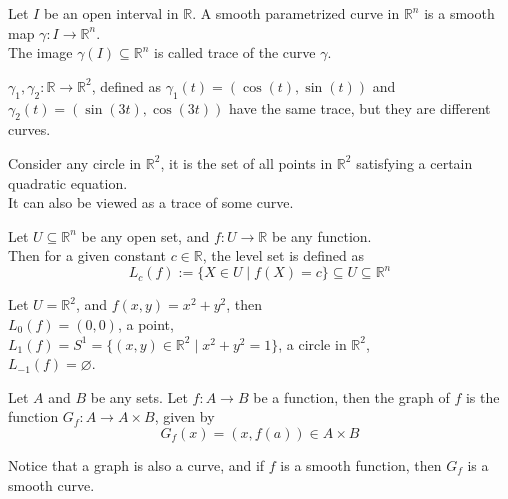 
\begin{definition}[Curves]
    Let $I$ be an open interval in $\mathbb{R}$. A smooth parametrized curve in $\mathbb{R}^n$ is a smooth map $\gamma:I\to\mathbb{R}^n$.\\
    The image $\gamma(I)\subseteq\mathbb{R}^n$ is called trace of the curve $\gamma$.
\end{definition}
\vspace{0.4cm}
\begin{eg}
    $\gamma_1,\gamma_2:\mathbb{R}\to\mathbb{R}^2$, defined as $\gamma_1(t)=(\cos(t),\sin(t))$ and $\gamma_2(t)=(\sin(3t),\cos(3t))$ have the same trace, but they are different curves.
\end{eg}
\vspace{0.4cm}
\begin{observe}
    Consider any circle in $\mathbb{R}^2$, it is the set of all points in $\mathbb{R}^2$ satisfying a certain quadratic equation.\\
    It can also be viewed as a trace of some curve.
\end{observe}
\vspace{0.4cm}
\begin{definition}
    Let $U\subseteq\mathbb{R}^n$ be any open set, and $f:U\to\mathbb{R}$ be any function.\\
    Then for a given constant $c\in\mathbb{R}$, the level set is defined as$$L_{c}(f):=\{X \in U \mid f(X)=c\} \subseteq U \subseteq\mathbb{R}^n$$
\end{definition}
\vspace{0.4cm}
\begin{eg}
    Let $U=\mathbb{R}^2$, and $f(x,y)=x^2+y^2$, then\\ 
    $L_{0}(f)={(0,0)}$, a point,\\
    $L_{1}(f)=S^{1}=\{(x,y)\in\mathbb{R}^2\mid x^2+y^2=1\}$, a circle in $\mathbb{R}^2$,\\
    $L_{-1}(f)=\varnothing$.
\end{eg}
\vspace{0.4cm}
\begin{definition}[Graph]
    Let $A$ and $B$ be any sets. Let $f:A\to B$ be a function, then the graph of $f$ is the function $G_{f}:A\to A\times B$, given by$$G_f(x)=(x,f(a))\in A\times B$$
\end{definition}
\vspace{0.4cm}
\begin{note}
    Notice that a graph is also a curve, and if $f$ is a smooth function, then $G_f$ is a smooth curve.
\end{note}
